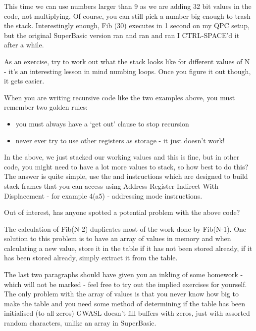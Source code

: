 This time we can use numbers larger than 9 as we are adding 32 bit
      values in the code, not multiplying. Of course, you can still pick a
      number big enough to trash the stack. Interestingly enough, Fib (30)
      executes in 1 second on my QPC setup, but the original SuperBasic
      version ran and ran and ran I CTRL-{}SPACE'd it after a while.

As an exercise, try to work out what the stack looks like for
      different values of N -{} it's an interesting lesson in mind numbing
      loops. Once you figure it out though, it gets easier.

When you are writing recursive code like the two examples above,
      you must remember two golden rules:
\begin{itemize}[itemsep=0pt]

\item{}you must always have a `get out' clause to stop
          recursion


\item{}never ever try to use other registers as storage -{} it just
          doesn't work!

\end{itemize}

In the above, we just stacked our working values and this is fine,
      but in other code, you might need to have a lot more values to stack, so
      how best to do this? The answer is quite simple, use the  and 
      instructions which are designed to build stack frames that you can
      access using Address Register Indirect With Displacement -{} for example
      4(a5) -{} addressing mode instructions.

Out of interest, has anyone spotted a potential problem with the
      above code?

The calculation of Fib(N-{}2) duplicates most of the work done by
      Fib(N-{}1). One solution to this problem is to have an array of values
      in memory and when calculating a new value, store it in the table if it
      has not been stored already, if it has been stored already, simply
      extract it from the table.

The last two paragraphs should have given you an inkling of some
      homework -{} which will not be marked -{} feel free to try out the implied
      exercises for yourself. The only problem with the array of values is
      that you never know how big to make the table and you need some method
      of determining if the table has been initialised (to all zeros) GWASL
      doesn't fill buffers with zeros, just with assorted random characters,
      unlike an array in SuperBasic.

